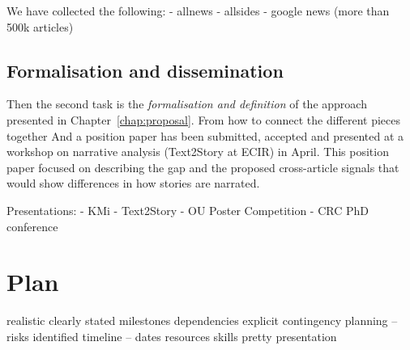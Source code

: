 We have collected the following:
- allnews
- allsides
- google news (more than 500k articles)


\subsection{Formalisation and dissemination}
Then the second task is the \emph{formalisation and definition} of the approach presented in Chapter~\ref{chap:proposal}.
From how to connect the different pieces together
And a position paper has been submitted, accepted and presented at a workshop on narrative analysis (Text2Story at ECIR) in April.
This position paper focused on describing the gap and the proposed cross-article signals that would show differences in how stories are narrated.

Presentations:
- KMi
- Text2Story
- OU Poster Competition
- CRC PhD conference






\section{Plan}

realistic
clearly stated milestones
dependencies explicit
contingency planning – risks identified
timeline – dates
resources
skills
pretty presentation

